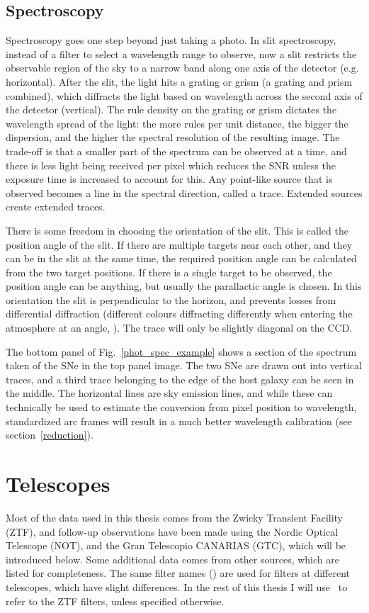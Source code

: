 \documentclass[a4paper,oneside,12pt, class=Latex/Classes/PhDthesisPSnPDF, crop=false]{standalone}
\begin{document}
\subsection{Spectroscopy}
Spectroscopy goes one step beyond just taking a photo. In slit spectroscopy, instead of a filter to select a wavelength range to observe, now a slit restricts the observable region of the sky to a narrow band along one axis of the detector (e.g. horizontal). After the slit, the light hits a grating or grism (a grating and prism combined), which diffracts the light based on wavelength across the second axis of the detector (vertical). The rule density on the grating or grism dictates the wavelength spread of the light: the more rules per unit distance, the bigger the dispersion, and the higher the spectral resolution of the resulting image. The trade-off is that a smaller part of the spectrum can be observed at a time, and there is less light being received per pixel which reduces the SNR unless the exposure time is increased to account for this. Any point-like source that is observed becomes a line in the spectral direction, called a trace. Extended sources create extended traces.

There is some freedom in choosing the orientation of the slit. This is called the position angle of the slit. If there are multiple targets near each other, and they can be in the slit at the same time, the required position angle can be calculated from the two target positions. If there is a single target to be observed, the position angle can be anything, but usually the parallactic angle is chosen. In this orientation the slit is perpendicular to the horizon, and prevents losses from differential diffraction (different colours diffracting differently when entering the atmosphere at an angle, \citealt{diff_refrac_atmosphere}). The trace will only be slightly diagonal on the CCD.

The bottom panel of Fig.~\ref{phot_spec_example} shows a section of the spectrum taken of the SNe in the top panel image. The two SNe are drawn out into vertical traces, and a third trace belonging to the edge of the host galaxy can be seen in the middle. The horizontal lines are sky emission lines, and while these can technically be used to estimate the conversion from pixel position to wavelength, standardized arc frames will result in a much better wavelength calibration (see section~\ref{reduction}).


\section{Telescopes}
\label{telescopes}
Most of the data used in this thesis comes from the Zwicky Transient Facility (ZTF), and follow-up observations have been made using the Nordic Optical Telescope (NOT), and the Gran Telescopio CANARIAS (GTC), which will be introduced below. Some additional data comes from other sources, which are listed for completeness. The same filter names (\ztfg\ztfr\ztfi) are used for filters at different telescopes, which have slight differences. In the rest of this thesis I will use \ztfg\ztfr\ztfi\ to refer to the ZTF filters, unless specified otherwise.
\end{document}
